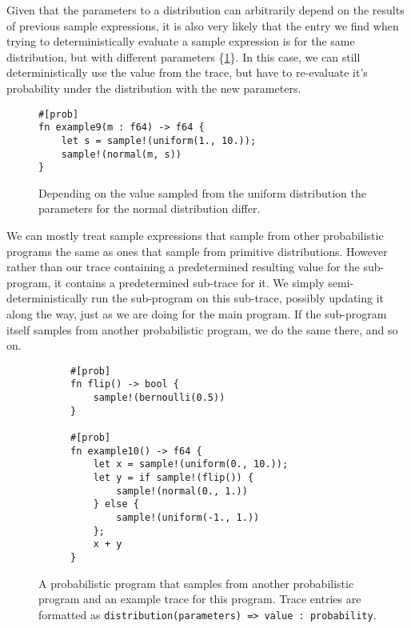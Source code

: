 Given that the parameters to a distribution can arbitrarily depend on the results of previous sample expressions, it is also very likely that the entry we find when trying to deterministically evaluate a sample expression is for the same distribution, but with different parameters \{\ref{example9}\}. In this case, we can still deterministically use the value from the trace, but have to re-evaluate it's probability under the distribution with the new parameters.

\begin{figure}[h]
\begin{lstlisting}
#[prob]
fn example9(m : f64) -> f64 {
    let s = sample!(uniform(1., 10.));
    sample!(normal(m, s))
}
\end{lstlisting}
\caption{Depending on the value sampled from the uniform distribution the parameters for the normal distribution differ.}
\label{example9}
\end{figure}

We can mostly treat sample expressions that sample from other probabilistic programs the same as ones that sample from primitive distributions. However rather than our trace containing a predetermined resulting value for the sub-program, it contains a predetermined sub-trace for it. We simply semi-deterministically run the sub-program on this sub-trace, possibly updating it along the way, just as we are doing for the main program. If the sub-program itself samples from another probabilistic program, we do the same there, and so on.

\begin{figure}[h]
\begin{subfigure}{0.5\textwidth}
\begin{lstlisting}
#[prob]
fn flip() -> bool {
    sample!(bernoulli(0.5))
}

#[prob]
fn example10() -> f64 {
    let x = sample!(uniform(0., 10.));
    let y = if sample!(flip()) {
        sample!(normal(0., 1.))
    } else {
        sample!(uniform(-1., 1.))
    };
    x + y
}
\end{lstlisting}
\end{subfigure}
\begin{subfigure}{0.55\textwidth}
\end{subfigure}
\caption{A probabilistic program that samples from another probabilistic program and an example trace for this program. Trace entries are formatted as \lstinline{distribution(parameters) => value : probability}.}
\label{example10}
\end{figure}

